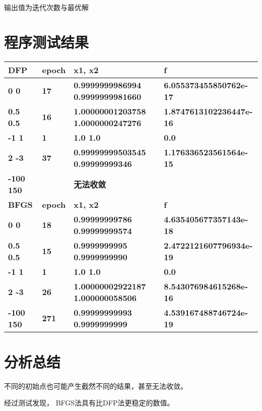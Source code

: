 \documentclass[12pt, a4paper, oneside]{ctexart}
\begin{document}
输出值为迭代次数与最优解

\section*{程序测试结果}

\begin{table}[H]
    \begin{tabular}{llll}
    \textbf{DFP} &
      \textbf{epoch} &
      \textbf{x1, x2} &
      \textbf{f} \\ \hline
    \multicolumn{1}{|l|}{\textbf{0 0}} &
      \multicolumn{1}{l|}{\textbf{17}} &
      \multicolumn{1}{l|}{\textbf{0.9999999986994 0.9999999981660}} &
      \multicolumn{1}{l|}{\textbf{6.055373455850762e-17}} \\ \hline
    \multicolumn{1}{|l|}{\textbf{0.5 0.5}} &
      \multicolumn{1}{l|}{\textbf{16}} &
      \multicolumn{1}{l|}{\textbf{1.00000001203758 1.0000000247276}} &
      \multicolumn{1}{l|}{\textbf{1.8747613102236447e-16}} \\ \hline
    \multicolumn{1}{|l|}{\textbf{-1 1}} &
      \multicolumn{1}{l|}{\textbf{1}} &
      \multicolumn{1}{l|}{\textbf{1.0 1.0}} &
      \multicolumn{1}{l|}{\textbf{0.0}} \\ \hline
    \multicolumn{1}{|l|}{\textbf{2 -3}} &
      \multicolumn{1}{l|}{\textbf{37}} &
      \multicolumn{1}{l|}{\textbf{0.99999999503545 0.99999999346}} &
      \multicolumn{1}{l|}{\textbf{1.176336523561564e-15}} \\ \hline
    \multicolumn{1}{|l|}{\textbf{-100 150}} &
      \multicolumn{1}{l|}{} &
      \multicolumn{1}{l|}{\textbf{无法收敛}} &
      \multicolumn{1}{l|}{} \\ \hline
    \textbf{BFGS} &
      \textbf{epoch} &
      \textbf{x1, x2} &
      \textbf{f} \\ \hline
    \multicolumn{1}{|l|}{\textbf{0 0}} &
      \multicolumn{1}{l|}{\textbf{18}} &
      \multicolumn{1}{l|}{\textbf{0.99999999786 0.99999999574}} &
      \multicolumn{1}{l|}{\textbf{4.635405677357143e-18}} \\ \hline
    \multicolumn{1}{|l|}{\textbf{0.5 0.5}} &
      \multicolumn{1}{l|}{\textbf{15}} &
      \multicolumn{1}{l|}{\textbf{0.9999999995 0.9999999990}} &
      \multicolumn{1}{l|}{\textbf{2.4722121607796934e-19}} \\ \hline
    \multicolumn{1}{|l|}{\textbf{-1 1}} &
      \multicolumn{1}{l|}{\textbf{1}} &
      \multicolumn{1}{l|}{\textbf{1.0 1.0}} &
      \multicolumn{1}{l|}{\textbf{0.0}} \\ \hline
    \multicolumn{1}{|l|}{\textbf{2 -3}} &
      \multicolumn{1}{l|}{\textbf{26}} &
      \multicolumn{1}{l|}{\textbf{1.00000002922187 1.000000058506}} &
      \multicolumn{1}{l|}{\textbf{8.543076984615268e-16}} \\ \hline
    \multicolumn{1}{|l|}{\textbf{-100 150}} &
      \multicolumn{1}{l|}{\textbf{271}} &
      \multicolumn{1}{l|}{\textbf{0.99999999993 0.9999999999}} &
      \multicolumn{1}{l|}{\textbf{4.539167488746724e-19}} \\ \hline
    \end{tabular}
    \end{table}
\section*{分析总结}
不同的初始点也可能产生截然不同的结果，甚至无法收敛。

经过测试发现， BFGS法具有比DFP法更稳定的数值。
\end{document}
